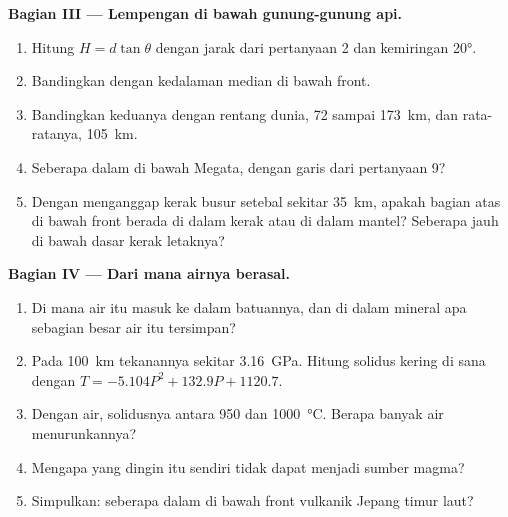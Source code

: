 \begin{problem}
\medskip
\noindent\textbf{Bagian III --- Lempengan di bawah gunung-gunung api.}
\begin{enumerate}[resume]
  \item Hitung $H = d\tan\theta$ dengan jarak dari pertanyaan 2 dan kemiringan
        \ang{20}.
  \item Bandingkan dengan kedalaman median di bawah front.
  \item Bandingkan keduanya dengan rentang dunia, 72 sampai \qty{173}{km}, dan
        rata-ratanya, \qty{105}{km}.
  \item Seberapa dalam  di bawah Megata, dengan garis dari
        pertanyaan 9?
  \item Dengan menganggap kerak busur setebal sekitar \qty{35}{km}, apakah
        bagian atas  di bawah front berada di dalam kerak atau di dalam
        mantel? Seberapa jauh di bawah dasar kerak letaknya?
\end{enumerate}

\medskip
\noindent\textbf{Bagian IV --- Dari mana airnya berasal.}
\begin{enumerate}[resume]
  \item Di mana air  itu masuk ke dalam batuannya, dan di dalam
        mineral apa sebagian besar air itu tersimpan?
  \item Pada \qty{100}{km} tekanannya sekitar \qty{3.16}{GPa}. Hitung solidus
        kering di sana dengan $T = -5.104P^2 + 132.9P + 1120.7$.
  \item Dengan air, solidusnya antara 950 dan \qty{1000}{\celsius}.
        Berapa banyak air menurunkannya?
  \item Mengapa  yang dingin itu sendiri tidak dapat menjadi sumber
        magma?
  \item Simpulkan: seberapa dalam  di bawah front vulkanik Jepang
        timur laut?
\end{enumerate}
\end{problem}
